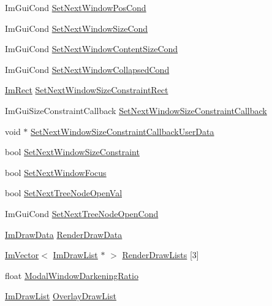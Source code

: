 \begin{DoxyCompactItemize}
Im\+Gui\+Cond \hyperlink{struct_im_gui_context_afdf440b5e79ba7868e87e2c5136e1296}{Set\+Next\+Window\+Pos\+Cond}
\item 
Im\+Gui\+Cond \hyperlink{struct_im_gui_context_ad0a5c6930741d040141ab7b097064c20}{Set\+Next\+Window\+Size\+Cond}
\item 
Im\+Gui\+Cond \hyperlink{struct_im_gui_context_af19b3352e14a7ac48f8c9a58e63eda9b}{Set\+Next\+Window\+Content\+Size\+Cond}
\item 
Im\+Gui\+Cond \hyperlink{struct_im_gui_context_a90e757b4703c106ecd41b05670f5799a}{Set\+Next\+Window\+Collapsed\+Cond}
\item 
\hyperlink{struct_im_rect}{Im\+Rect} \hyperlink{struct_im_gui_context_ab0e529d62651845ef9ae265447e1d0c8}{Set\+Next\+Window\+Size\+Constraint\+Rect}
\item 
Im\+Gui\+Size\+Constraint\+Callback \hyperlink{struct_im_gui_context_a304a1bfd5dbcebee45ba8cdfa5d231cb}{Set\+Next\+Window\+Size\+Constraint\+Callback}
\item 
void $\ast$ \hyperlink{struct_im_gui_context_a5da8374c369cff287b16ac7d8e3a7901}{Set\+Next\+Window\+Size\+Constraint\+Callback\+User\+Data}
\item 
bool \hyperlink{struct_im_gui_context_a9d2204e10eb23d9ab8aa653b555fb851}{Set\+Next\+Window\+Size\+Constraint}
\item 
bool \hyperlink{struct_im_gui_context_a11a744f855421fedef4adff0cac48bcb}{Set\+Next\+Window\+Focus}
\item 
bool \hyperlink{struct_im_gui_context_aab81a8f92b73046a0277f77fad4dcc85}{Set\+Next\+Tree\+Node\+Open\+Val}
\item 
Im\+Gui\+Cond \hyperlink{struct_im_gui_context_a2b78c616a3d9d26cfe28c575fe6506dc}{Set\+Next\+Tree\+Node\+Open\+Cond}
\item 
\hyperlink{struct_im_draw_data}{Im\+Draw\+Data} \hyperlink{struct_im_gui_context_a81cacf53454e6dc932a7e3181179a3af}{Render\+Draw\+Data}
\item 
\hyperlink{class_im_vector}{Im\+Vector}$<$ \hyperlink{struct_im_draw_list}{Im\+Draw\+List} $\ast$ $>$ \hyperlink{struct_im_gui_context_a65c7d5bafc5cb52d77d181925ff777da}{Render\+Draw\+Lists} \mbox{[}3\mbox{]}
\item 
float \hyperlink{struct_im_gui_context_ac4088a7de19357cdfeb3ead2d53ffcd8}{Modal\+Window\+Darkening\+Ratio}
\item 
\hyperlink{struct_im_draw_list}{Im\+Draw\+List} \hyperlink{struct_im_gui_context_abc8e0592d9beea307d78661df0a38b1a}{Overlay\+Draw\+List}
\item 

\end{DoxyCompactItemize}
